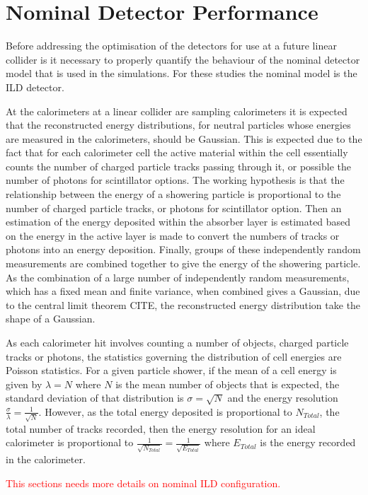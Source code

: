 \section{Nominal Detector Performance}
Before addressing the optimisation of the detectors for use at a future linear collider is it necessary to properly quantify the behaviour of the nominal detector model that is used in the simulations.  For these studies the nominal model is the ILD detector.  

At the calorimeters at a linear collider are sampling calorimeters it is expected that the reconstructed energy distributions, for neutral particles whose energies are measured in the calorimeters, should be Gaussian.  This is expected due to the fact that for each calorimeter cell the active material within the cell essentially counts the number of charged particle tracks passing through it, or possible the number of photons for scintillator options.  The working hypothesis is that the relationship between the energy of a showering particle is proportional to the number of charged particle tracks, or photons for scintillator option.  Then an estimation of the energy deposited within the absorber layer is estimated based on the energy in the active layer is made to convert the numbers of tracks or photons into an energy deposition.  Finally, groups of these independently random measurements are combined together to give the energy of the showering particle.  As the combination of a large number of independently random measurements, which has a fixed mean and finite variance, when combined gives a Gaussian, due to the central limit theorem CITE, the reconstructed energy distribution take the shape of a Gaussian.  

As each calorimeter hit involves counting a number of objects, charged particle tracks or photons, the statistics governing the distribution of cell energies are Poisson statistics.  For a given particle shower, if the mean of a cell energy is given by $\lambda = N$ where $N$ is the mean number of objects that is expected, the standard deviation of that distribution is $\sigma = \sqrt{N}$ and the energy resolution $\frac{\sigma}{\lambda} = \frac{1}{\sqrt{N}}$.  However, as the total energy deposited is proportional to $N_{Total}$, the total number of tracks recorded, then the energy resolution for an ideal calorimeter is proportional to $\frac{1}{\sqrt{N_{Total}}} = \frac{1}{\sqrt{E_{Total}}}$ where $E_{Total}$ is the energy recorded in the calorimeter.  

\textcolor{red}{This sections needs more details on nominal ILD configuration.}

